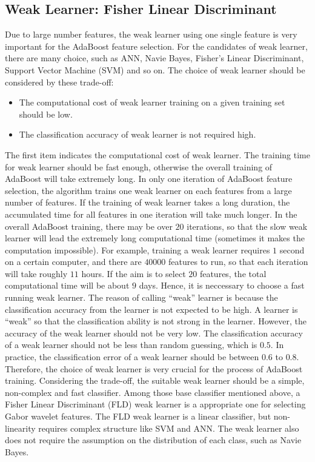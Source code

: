 \subsection{Weak Learner: Fisher Linear Discriminant}
\label{sec:faceveri:fld}
Due to large number features, the weak learner using one single feature is very important for the AdaBoost feature selection. For the candidates of weak learner, there are many choice, such as ANN, Navie Bayes, Fisher's Linear Discriminant, Support Vector Machine (SVM) and so on. The choice of weak learner should be considered by these trade-off:
\begin{itemize}
 \item The computational cost of weak learner training on a given training set should be low.
 \item The classification accuracy of weak learner is not required high. 
\end{itemize}
The first item indicates the computational cost of weak learner. The training time for weak learner should be fast enough, otherwise the overall training of AdaBoost will take extremely long. In only one iteration of AdaBoost feature selection, the algorithm trains one weak learner on each features from a large number of features. If the training of weak learner takes a long duration, the accumulated time for all features in one iteration will take much longer. In the overall AdaBoost training, there may be over $20$ iterations, so that the slow weak learner will lead the extremely long computational time (sometimes it makes the computation impossible). For example, training a weak learner requires $1$ second on a certain computer, and there are $40000$ features to run, so that each iteration will take roughly $11$ hours. If the aim is to select $20$ features, the total computational time will be about $9$ days. Hence, it is neccessary to choose a fast running weak learner. The reason of calling ``weak'' learner is because the classification accuracy from the learner is not expected to be high. A learner is ``weak'' so that the classification ability is not strong in the learner. However, the accuracy of the weak learner should not be very low. The classification accuracy of a weak learner should not be less than random guessing, which is $0.5$. In practice, the classification error of a weak learner should be between $0.6$ to $0.8$. Therefore, the choice of weak learner is very crucial for the process of AdaBoost training. Considering the trade-off, the suitable weak learner should be a simple, non-complex and fast classifier. Among those base classifier mentioned above, a Fisher Linear Discriminant (FLD) weak learner is a appropriate one for selecting Gabor wavelet features. The FLD weak learner is a linear classifier, but non-linearity requires complex structure like SVM and ANN. The weak learner also does not require the assumption on the distribution of each class, such as Navie Bayes.

